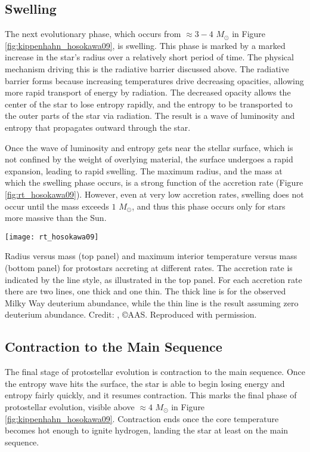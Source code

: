 \subsection{Swelling}

The next evolutionary phase, which occurs from $\approx 3-4$ $M_\odot$ in Figure \ref{fig:kippenhahn_hosokawa09}, is swelling. This phase is marked by a marked increase in the star's radius over a relatively short period of time. The physical mechanism driving this is the radiative barrier discussed above. The radiative barrier forms because increasing temperatures drive decreasing opacities, allowing more rapid transport of energy by radiation. The decreased opacity allows the center of the star to lose entropy rapidly, and the entropy to be transported to the outer parts of the star via radiation. The result is a wave of luminosity and entropy that propagates outward through the star.

Once the wave of luminosity and entropy gets near the stellar surface, which is not confined by the weight of overlying material, the surface undergoes a rapid expansion, leading to rapid swelling. The maximum radius, and the mass at which the swelling phase occurs, is a strong function of the accretion rate (Figure \ref{fig:rt_hosokawa09}). However, even at very low accretion rates, swelling does not occur until the mass exceeds $1$ $M_\odot$, and thus this phase occurs only for stars more massive than the Sun.

\begin{marginfigure}
\texttt{[image: rt\_hosokawa09]}
\caption[Protostellar mass-radius relation for different accretion rates]{
\label{fig:rt_hosokawa09}
Radius versus mass (top panel) and maximum interior temperature versus mass (bottom panel) for protostars accreting at different rates. The accretion rate is indicated by the line style, as illustrated in the top panel. For each accretion rate there are two lines, one thick and one thin. The thick line is for the observed Milky Way deuterium abundance, while the thin line is the result assuming zero deuterium abundance.  Credit: \citet{hosokawa09a}, \copyright AAS. Reproduced with permission.
}
\end{marginfigure}

\subsection{Contraction to the Main Sequence}

The final stage of protostellar evolution is contraction to the main sequence. Once the entropy wave hits the surface, the star is able to begin losing energy and entropy fairly quickly, and it resumes contraction. This marks the final phase of protostellar evolution, visible above $\approx 4$ $M_\odot$ in Figure \ref{fig:kippenhahn_hosokawa09}. Contraction ends once the core temperature becomes hot enough to ignite hydrogen, landing the star at least on the main sequence.

